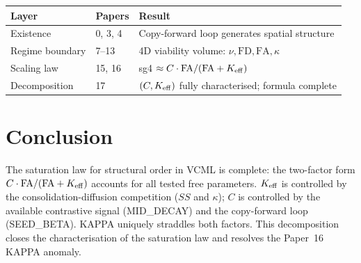 \documentclass[11pt,a4paper]{article}
\begin{document}
\begin{center}
\begin{tabular}{llp{8cm}}
\toprule
Layer & Papers & Result \\
\midrule
Existence & 0, 3, 4 & Copy-forward loop generates spatial structure \\
Regime boundary & 7--13 & 4D viability volume: $\nu, \mathrm{FD}, \mathrm{FA}, \kappa$ \\
Scaling law & 15, 16 & sg4 $\approx C \cdot \mathrm{FA}/(\mathrm{FA}+K_{\rm eff})$ \\
Decomposition & 17 & $(C, K_{\rm eff})$ fully characterised; formula complete \\
\bottomrule
\end{tabular}
\end{center}

\section{Conclusion}

The saturation law for structural order in VCML is complete: the two-factor form
$C \cdot \mathrm{FA}/(\mathrm{FA}+K_{\rm eff})$ accounts for all tested free
parameters.  $K_{\rm eff}$ is controlled by the consolidation-diffusion competition
($SS$ and $\kappa$); $C$ is controlled by the available contrastive signal (MID\_DECAY)
and the copy-forward loop (SEED\_BETA).  KAPPA uniquely straddles both factors.
This decomposition closes the characterisation of the saturation law and resolves the
Paper~16 KAPPA anomaly.
\end{document}
